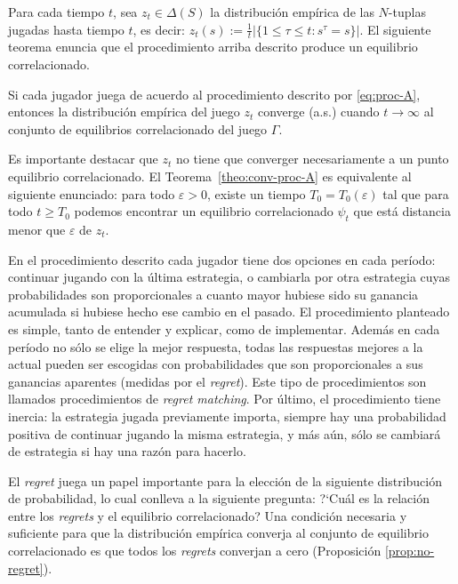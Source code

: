 Para cada tiempo $t$, sea $z_t \in \Delta(S)$ la distribución empírica de las $N$-tuplas jugadas hasta tiempo $t$, es decir:
$z_t(s) := \frac{1}{t} |\{1\leq\tau \leq t : s^{\tau} = s \}|$. El siguiente teorema enuncia que el procedimiento arriba descrito produce un equilibrio correlacionado.

\begin{theorem}
\label{theo:conv-proc-A}
Si cada jugador juega de acuerdo al procedimiento descrito por \eqref{eq:proc-A}, entonces la distribución empírica del juego $z_t$ converge (a.s.) cuando $t \rightarrow \infty$ al conjunto de equilibrios correlacionado del juego $\Gamma$.
\end{theorem}

Es importante destacar que $z_t$ no tiene que converger necesariamente a un punto equilibrio correlacionado. El Teorema~\ref{theo:conv-proc-A} es equivalente al siguiente enunciado: para todo $\varepsilon > 0$, existe un tiempo $T_0 = T_0(\varepsilon)$ tal que para todo $t \geq T_0$ podemos encontrar un equilibrio correlacionado $\psi_t$ que está distancia menor que $\varepsilon$ de $z_t$.

En el procedimiento descrito cada jugador tiene dos opciones en cada período: continuar jugando con la última estrategia, o cambiarla por otra estrategia cuyas probabilidades son proporcionales a cuanto mayor hubiese sido su ganancia acumulada si hubiese hecho ese cambio en el pasado. El procedimiento planteado es simple, tanto de entender y explicar, como de implementar. Además en cada período no sólo se elige la mejor respuesta, todas las respuestas mejores a la actual pueden ser escogidas con probabilidades que son proporcionales a sus ganancias aparentes (medidas por el \textit{regret}). Este tipo de procedimientos son llamados procedimientos de \textit{regret matching}. Por último, el procedimiento tiene inercia: la estrategia jugada previamente importa, siempre hay una probabilidad positiva de continuar jugando la misma estrategia, y más aún, sólo se cambiará de estrategia si hay una razón para hacerlo.

El \textit{regret} juega un papel importante para la elección de la siguiente distribución de probabilidad, lo cual conlleva a la siguiente pregunta: ?`Cuál es la relación entre los \textit{regrets} y el equilibrio correlacionado? Una condición necesaria y suficiente para que la distribución empírica converja al conjunto de equilibrio correlacionado es que todos los \textit{regrets} converjan a cero (Proposición \ref{prop:no-regret}).

